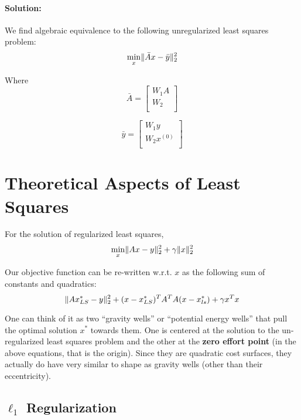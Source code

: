 \documentclass[a4paper,12pt]{report}
\DeclarePairedDelimiter\norm{\lVert}{\rVert}%
\begin{document}
\paragraph{Solution: } 
We find algebraic equivalence to the following unregularized least squares problem:
\begin{equation}
\min_x \norm{\bar A x - \bar y}_2^2
\end{equation}

Where
\begin{equation}
\bar A = \begin{bmatrix}
W_1 A \\
W_2 \\
\end{bmatrix}
\end{equation}

\begin{equation}
\bar y = \begin{bmatrix}
W_1 y \\
W_2 x^{(0)} \\
\end{bmatrix}
\end{equation}





\section{Theoretical Aspects of Least Squares}

For the solution of regularized least squares, 
\begin{equation}
\min_x \norm{Ax - y}_2^2 + \gamma \norm{x}_2^2
\end{equation}

Our objective function can be re-written w.r.t. $x$ as the following sum of constants and quadratics:
\begin{equation}
\norm{Ax^*_{LS} - y}_2^2 + (x - x_{LS}^*)^T A^T A (x - x_{ls}^*) + \gamma x^T x
\end{equation}

One can think of it as two ``gravity wells'' or ``potential energy wells'' that pull the optimal solution $x^*$ towards them. One is centered at the solution to the un-regularized least squares problem and the other at the \textbf{zero effort point} (in the above equations, that is the origin). Since they are quadratic cost surfaces, they actually do have very similar to shape as gravity wells (other than their eccentricity).

\subsection{$\ell_1$ Regularization}
\end{document}

